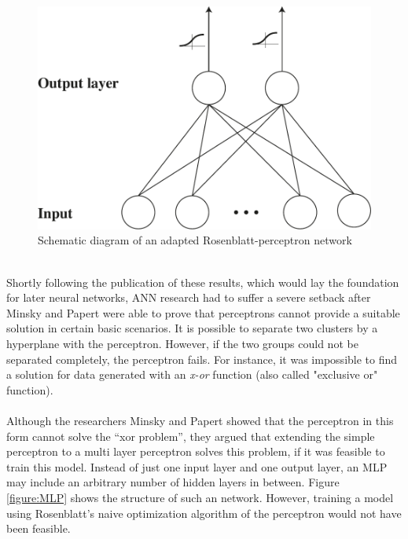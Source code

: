 \documentclass[11pt,a4paper]{article}
\begin{document}
\begin{figure}[h]
	\centering
	\includegraphics[scale=0.5]{adaption_perceptron2.pdf}
	\caption{Schematic diagram of an adapted Rosenblatt-perceptron network}
	\label{adaption_perceptron}
\end{figure}
\ \\
Shortly following the publication of these results, which would lay the foundation for later neural networks, ANN research had to suffer a severe setback after Minsky and Papert \cite{Minsky1969} were able to prove that perceptrons cannot provide a suitable solution in certain basic scenarios. It is possible to separate two clusters by a hyperplane with the perceptron. However, if the two groups could not be separated completely, the perceptron fails. For instance, it was impossible to find a solution for data generated with an \textit{x-or} function (also called "exclusive or" function).\\
\ \\
Although the researchers Minsky and Papert showed that the perceptron in this form cannot solve the “xor problem”, they argued that extending the simple perceptron to a multi layer perceptron solves this problem, if it was feasible to train this model. Instead of just one input layer and one output layer, an MLP may include an arbitrary number of hidden layers in between. Figure \ref{figure:MLP} shows the structure of such an network. However, training a model using Rosenblatt's naive optimization algorithm of the perceptron would not have been feasible.\\
\end{document}
